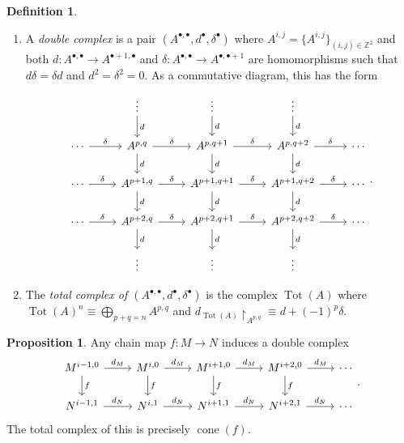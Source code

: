 \documentclass[10pt,letterpaper,cm]{nupset}
\theoremstyle{definition}
\newtheorem*{definition}{Definition}
\newtheorem{prop}{Proposition}
\newcommand{\Z}{\mathbb Z}
\newcommand{\1}{\mathbf{1}}
\newcommand{\0}{\vec 0}
\DeclareMathOperator{\cone}{cone}
\DeclareMathOperator{\tot}{Tot}
\begin{document}
\begin{definition} $ $
\begin{enumerate}
\item A \textit{double complex} is a pair $(A^{\bullet, \bullet}, d^{\bullet}, \delta^{\bullet})$ where $A^{i,j} = \{A^{i,j}\}_{(i,j) \in \Z^2}$ and both $d : A^{\bullet, \bullet} \to A^{\bullet +1, \bullet}$ and $\delta : A^{\bullet, \bullet} \to A^{\bullet, \bullet +1}$ are homomorphisms such that $d{\delta} = \delta{d}$ and $d^2 = \delta^2 =0$.
As a commutative diagram, this has the form
 \[
\begin{tikzcd}
                           & \vdots \arrow[d, "d"]                           & \vdots \arrow[d, "d"]                            & \vdots \arrow[d, "d"]                            &        \\
\cdots \arrow[r, "\delta"] & {A^{p,q}} \arrow[d, "d"] \arrow[r, "\delta"]    & {A^{p,q+1}} \arrow[d, "d"] \arrow[r, "\delta"]   & {A^{p,q+2}} \arrow[r, "\delta"] \arrow[d, "d"]   & \cdots \\
\cdots \arrow[r, "\delta"] & {A^{p+1, q}} \arrow[d, "d"] \arrow[r, "\delta"] & {A^{p+1,q+1}} \arrow[d, "d"] \arrow[r, "\delta"] & {A^{p+1,q+2}} \arrow[r, "\delta"] \arrow[d, "d"] & \cdots \\
\cdots \arrow[r, "\delta"] & {A^{p+2, q}} \arrow[r, "\delta"] \arrow[d, "d"] & {A^{p+2,q+1}} \arrow[r, "\delta"] \arrow[d, "d"] & {A^{p+2,q+2}} \arrow[r, "\delta"] \arrow[d, "d"] & \cdots \\
                           & \vdots                                          & \vdots                                           & \vdots                                           &       
\end{tikzcd}
.\]
\item The \textit{total complex of $(A^{\bullet, \bullet}, d^{\bullet}, \delta^{\bullet})$} is the complex $ \tot(A)$ where $\tot(A)^n \equiv \bigoplus_{p+q =n} A^{p,q}$ and $d_{\tot(A)}\restriction_{A^{p,q}} \equiv d + ({-}1)^p \delta$. 
\end{enumerate}
\end{definition}

\begin{prop}
Any chain map $f: M \to N$ induces a double complex 
\[
\begin{tikzcd}
{M^{i-1, 0}} \arrow[d, "f"] \arrow[r, "d_M"] & M^{i,0} \arrow[d, "f"] \arrow[r, "d_M"] & M^{i+1,0} \arrow[d, "f"] \arrow[r, "d_M"] & M^{i+2,0} \arrow[d, "f"] \arrow[r, "d_M"] & \cdots \\
{N^{i-1,1}} \arrow[r, "d_N"]                 & N^{i,1} \arrow[r, "d_N"]                & N^{i+1,1} \arrow[r, "d_N"]                & N^{i+2,1} \arrow[r, "d_N"]                & \cdots
\end{tikzcd}
.\]
The total complex of this is precisely $\cone(f)$.
\end{prop}
\end{document}
